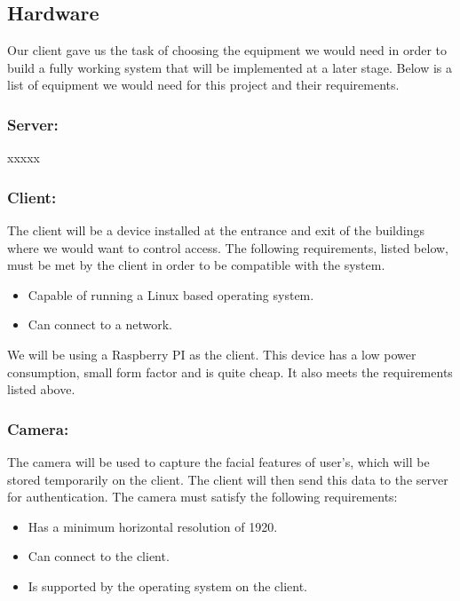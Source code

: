 \subsection{Hardware}
Our client gave us the task of choosing the equipment we would need in order to build a fully working system that will be implemented at a later stage. Below is a list of equipment we would need for this project and their requirements.

	\subsubsection{Server:}
	xxxxx
	
	\subsubsection{Client:}
	The client will be a device installed at the entrance and exit of the buildings where we would want to control access. The following requirements, listed below, must be met by the client in order to be compatible with the system.
	\begin{itemize}
		\item Capable of running a Linux based operating system.
		\item Can connect to a network.
	\end{itemize}
	
We will be using a Raspberry PI as the client. This device has a low power consumption, small form factor and is quite cheap. It also meets the requirements listed above.

	\subsubsection{Camera:}
	The camera will be used to capture the facial features of user's, which will be stored temporarily on the client. The client will then send this data to the server for authentication. The camera must satisfy the following requirements:
	\begin{itemize}
		\item Has a minimum horizontal resolution of 1920. %
		\item Can connect to the client.
		\item Is supported by the operating system on the client.
	\end{itemize}
	
